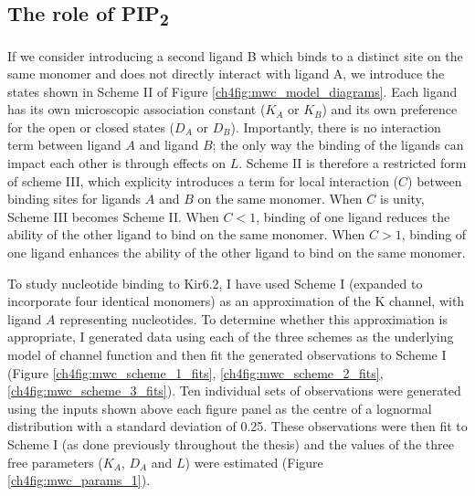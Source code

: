 \subsection{The role of PIP\textsubscript{2}}

If we consider introducing a second ligand B which binds to a distinct site on the same monomer and does not directly interact with ligand A, we introduce the states shown in Scheme II of Figure \ref{ch4fig:mwc_model_diagrams}.
Each ligand has its own microscopic association constant ($K_A$ or $K_B$) and its own preference for the open or closed states ($D_A$ or $D_B$).
Importantly, there is no interaction term between ligand $A$ and ligand $B$; the only way the binding of the ligands can impact each other is through effects on $L$.
Scheme II is therefore a restricted form of scheme III, which explicity introduces a term for local interaction ($C$) between binding sites for ligands $A$ and $B$ on the same monomer.
When $C$ is unity, Scheme III becomes Scheme II.
When $C<1$, binding of one ligand reduces the ability of the other ligand to bind on the same monomer.
When $C>1$, binding of one ligand enhances the ability of the other ligand to bind on the same monomer.

To study nucleotide binding to Kir6.2, I have used Scheme I (expanded to incorporate four identical monomers) as an approximation of the K\ATP{} channel, with ligand $A$ representing nucleotides.
To determine whether this approximation is appropriate, I generated data using each of the three schemes as the underlying model of channel function and then fit the generated observations to Scheme I (Figure \ref{ch4fig:mwc_scheme_1_fits}, \ref{ch4fig:mwc_scheme_2_fits}, \ref{ch4fig:mwc_scheme_3_fits}).
Ten individual sets of observations were generated using the inputs shown above each figure panel as the centre of a lognormal distribution with a standard deviation of 0.25.
These observations were then fit to Scheme I (as done previously throughout the thesis) and the values of the three free parameters ($K_A$, $D_A$ and $L$) were estimated (Figure \ref{ch4fig:mwc_params_1}).

